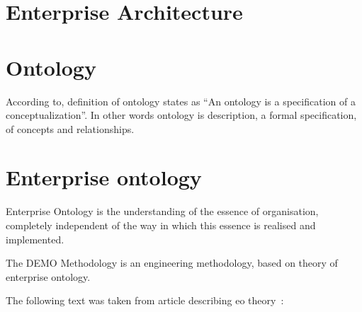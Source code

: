 
\section{Enterprise Architecture}


\section{Ontology}
According to\cite{gruber-translation-1993}, definition of ontology states as ``An ontology is a specification of a conceptualization''. In other words ontology is description, a formal specification, of concepts and relationships.

\section{Enterprise ontology}
Enterprise Ontology\cite{perinforma-essence-2015} is the understanding of the essence of organisation, completely independent of the way in which this essence is realised and implemented.

The DEMO Methodology\cite{dietz-enterprise-2006} is an engineering methodology, based on theory of enterprise ontology.

The following text was taken from article describing \gls{eo} theory~\cite{haan-modeling-2009}:

